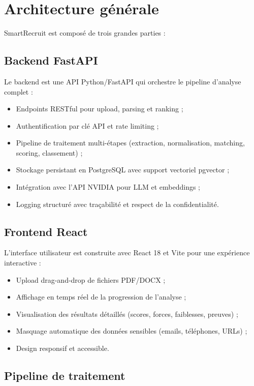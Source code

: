 \documentclass[12pt,a4paper,oneside]{book}
\begin{document}
\section{Architecture générale}

SmartRecruit est composé de trois grandes parties :

\subsection{Backend FastAPI}

Le backend est une API Python/FastAPI qui orchestre le pipeline d'analyse complet :

\begin{itemize}
    \item Endpoints RESTful pour upload, parsing et ranking ;
    \item Authentification par clé API et rate limiting ;
    \item Pipeline de traitement multi-étapes (extraction, normalisation, matching, scoring, classement) ;
    \item Stockage persistant en PostgreSQL avec support vectoriel pgvector ;
    \item Intégration avec l'API NVIDIA pour LLM et embeddings ;
    \item Logging structuré avec traçabilité et respect de la confidentialité.
\end{itemize}

\subsection{Frontend React}

L'interface utilisateur est construite avec React 18 et Vite pour une expérience interactive :

\begin{itemize}
    \item Upload drag-and-drop de fichiers PDF/DOCX ;
    \item Affichage en temps réel de la progression de l'analyse ;
    \item Visualisation des résultats détaillés (scores, forces, faiblesses, preuves) ;
    \item Masquage automatique des données sensibles (emails, téléphones, URLs) ;
    \item Design responsif et accessible.
\end{itemize}

\subsection{Pipeline de traitement}
\end{document}
